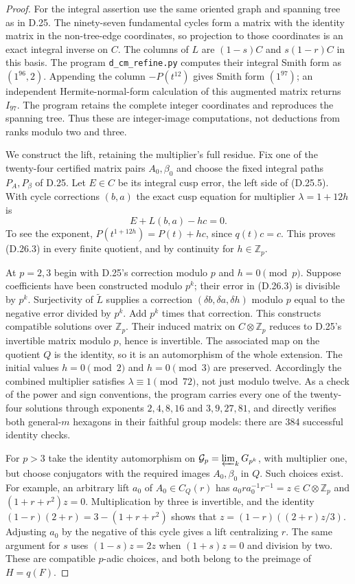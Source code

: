 \begin{proof}
For the integral assertion use the same oriented graph and
spanning tree as in D.25. The ninety-seven fundamental cycles
form a matrix with the identity matrix in the non-tree-edge
coordinates, so projection to those coordinates is an exact
integral inverse on $C$. The columns of $L$ are
$(1-s)C$ and $s(1-r)C$ in this basis. The program
\texttt{d\_cm\_refine.py} computes their integral Smith form
as $(1^{96},2)$. Appending the column $-P(t^{12})$ gives
Smith form $(1^{97})$; an independent Hermite-normal-form
calculation of this augmented matrix returns $I_{97}$.
The program retains the complete integer coordinates and
reproduces the spanning tree. Thus these are integer-image
computations, not deductions from ranks modulo two and three.

We construct the lift, retaining the multiplier's full
residue. Fix one of the twenty-four certified matrix pairs
$A_0,\beta_0$ and choose the fixed integral paths $P_A,P_\beta$
of D.25. Let $E\in C$ be its integral cusp error, the left
side of (D.25.5). With cycle corrections $(b,a)$ the exact
cusp equation for multiplier $\lambda=1+12h$ is
\[
       E+L(b,a)-hc=0.                                  \tag{D.26.3}
\]
To see the exponent, $P(t^{1+12h})=P(t)+hc$, since
$q(t)c=c$. This proves (D.26.3) in every finite quotient,
and by continuity for $h\in\mathbb Z_p$.

At $p=2,3$ begin with D.25's correction modulo $p$ and
$h=0\pmod p$. Suppose coefficients have been constructed
modulo $p^k$; their error in (D.26.3) is divisible by $p^k$.
Surjectivity of $\widetilde L$ supplies a correction
$(\delta b,\delta a,\delta h)$ modulo $p$ equal to the
negative error divided by $p^k$. Add $p^k$ times that
correction. This constructs compatible solutions over
$\mathbb Z_p$. Their induced matrix on $C\otimes\mathbb Z_p$
reduces to D.25's invertible matrix modulo $p$, hence is
invertible. The associated map on the quotient $Q$ is the
identity, so it is an automorphism of the whole extension.
The initial values $h=0\pmod2$ and $h=0\pmod3$ are
preserved. Accordingly the combined multiplier satisfies
$\lambda\equiv1\pmod{72}$, not just modulo twelve.
As a check of the power and sign conventions, the program
carries every one of the twenty-four solutions through
exponents $2,4,8,16$ and $3,9,27,81$, and directly verifies
both general-$m$ hexagons in their faithful group models:
there are 384 successful identity checks.

For $p>3$ take the identity automorphism on
$\mathcal G_p=\varprojlim_k G_{p^k}$, with multiplier one,
but choose conjugators with the required images
$A_0,\beta_0$ in $Q$. Such choices exist. For example,
an arbitrary lift $a_0$ of $A_0\in C_Q(r)$ has
$a_0ra_0^{-1}r^{-1}=z\in C\otimes\mathbb Z_p$ and
$(1+r+r^2)z=0$. Multiplication by three is invertible,
and the identity
$(1-r)(2+r)=3-(1+r+r^2)$ shows that
$z=(1-r)((2+r)z/3)$. Adjusting $a_0$ by the negative of
this cycle gives a lift centralizing $r$. The same argument
for $s$ uses $(1-s)z=2z$ when $(1+s)z=0$ and division by
two. These are compatible $p$-adic choices, and both belong
to the preimage of $H=q(F)$.


\end{proof}
